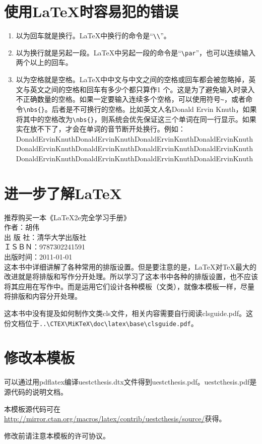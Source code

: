 \section{使用\LaTeX{}时容易犯的错误}
\begin{enumerate}
\item 以为回车就是换行。\LaTeX{}中换行的命令是“\verb|\\|”。
\item 以为换行就是另起一段。\LaTeX{}中另起一段的命令是“\verb|\par|”，也可以连续输入两个以上的回车。
\item 以为空格就是空格。\LaTeX{}中中文与中文之间的空格或回车都会被忽略掉，英文与英文之间的空格和回车有多少个都只算作1 个。这是为了避免输入时录入不正确数量的空格。如果一定要输入连续多个空格，可以使用符号\verb|~|，或者命令\verb|\nbs{}|。后者是不可换行的空格。比如英文人名Donald Ervin Knuth，如果将其中的空格改为\verb|\nbs{}|，则系统会优先保证这三个单词在同一行显示。如果实在放不下了，才会在单词的音节断开处换行。例如：
    Donald\nbs{}Ervin\nbs{}Knuth\nbs{}Donald\nbs{}Ervin\nbs{}Knuth\nbs{}Donald\nbs{}Ervin\nbs{}Knuth\nbs{}Donald\nbs{}Ervin\nbs{}Knuth\nbs{}Donald\nbs{}Ervin\nbs{}Knuth\nbs{}Donald\nbs{}Ervin\nbs{}Knuth\nbs{}Donald\nbs{}Ervin\nbs{}Knuth\nbs{}Donald\nbs{}Ervin\nbs{}Knuth\nbs{}Donald\nbs{}Ervin\nbs{}Knuth\nbs{}Donald\nbs{}Ervin\nbs{}Knuth\nbs{}Donald\nbs{}Ervin\nbs{}Knuth\nbs{}Donald\nbs{}Ervin\nbs{}Knuth\nbs{}
\end{enumerate}

\section{进一步了解\LaTeX}
推荐购买一本《LaTeX2e完全学习手册》\\
作者：胡伟\\
出 版 社：清华大学出版社\\
ＩＳＢＮ：9787302241591 \\
出版时间：2011-01-01\\

这本书中详细讲解了各种常用的排版设置。但是要注意的是，\LaTeX{}对\TeX{}最大的改进就是将排版和写作分开处理。所以学习了这本书中各种的排版设置，也不应该将其应用在写作中。而是运用它们设计各种模板（文类），就像本模板一样，尽量将排版和内容分开处理。

这本书中没有提及如何制作文类cls文件，相关内容需要自行阅读clsguide.pdf。这份文档位于\verb|..\CTEX\MiKTeX\doc\latex\base\clsguide.pdf|。

\section{修改本模板}
可以通过用pdflatex编译uestcthesis.dtx文件得到uestcthesis.pdf。uestcthesis.pdf是源代码的说明文档。

本模板源代码可在\url{http://mirror.ctan.org/macros/latex/contrib/uestcthesis/source/}获得。

修改前请注意本模板的许可协议。

